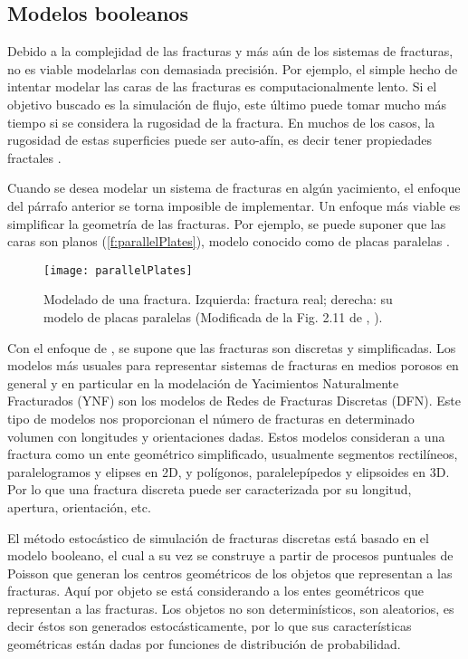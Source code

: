 \subsection{Modelos booleanos}

Debido a la complejidad de las fracturas y m\'as a\'un de los sistemas de fracturas, no es viable modelarlas con demasiada precisi\'on. Por ejemplo, el simple hecho de intentar modelar las caras de las fracturas es computacionalmente lento. Si el objetivo buscado es la simulaci\'on de flujo, este \'ultimo puede tomar mucho m\'as tiempo si se considera la rugosidad de la fractura. En muchos de los casos, la rugosidad de estas superficies puede ser auto-af\'in, es decir tener propiedades fractales \citep[ch. 4]{adler_fractures_1999}.

Cuando se desea modelar un sistema de fracturas en alg\'un yacimiento, el enfoque del p\'arrafo anterior se torna imposible de implementar. Un enfoque m\'as viable es simplificar la geometr\'ia de las fracturas. Por ejemplo, se puede suponer que las caras son planos (\autoref{f:parallelPlates}), modelo conocido como de placas paralelas \citep{dietrich_flow_2005}.

\begin{figure}[H]
	\centering
	\texttt{[image: parallelPlates]}
	\caption{Modelado de una fractura. Izquierda: fractura real; derecha: su modelo de placas paralelas (Modificada de la Fig. 2.11 de \citeauthor{dietrich_flow_2005}, \citeyear{dietrich_flow_2005}).}
	\label{f:parallelPlates}
\end{figure}

Con el enfoque de \cite{dietrich_flow_2005}, se supone que las fracturas son discretas y simplificadas. Los modelos m\'as usuales para representar sistemas de fracturas en medios porosos en general y en particular en la modelaci\'on de Yacimientos Naturalmente Fracturados (YNF) son los modelos de Redes de Fracturas Discretas (DFN). Este tipo de modelos nos proporcionan el n\'umero de fracturas en determinado volumen con longitudes y orientaciones dadas. Estos modelos consideran a una fractura como un ente geom\'etrico simplificado, usualmente segmentos rectil\'ineos, paralelogramos y elipses en 2D, y pol\'igonos, paralelep\'ipedos y elipsoides en 3D. Por lo que una fractura discreta puede ser caracterizada por su longitud, apertura, orientaci\'on, etc. 

El m\'etodo estoc\'astico de simulaci\'on de fracturas discretas est\'a basado en el modelo booleano, el cual a su vez se construye a partir de procesos puntuales de Poisson que generan los centros geom\'etricos de los objetos que representan a las fracturas. Aqu\'i por objeto se est\'a considerando a los entes geom\'etricos que representan a las fracturas. Los objetos no son determin\'isticos, son aleatorios, es decir \'estos son generados estoc\'asticamente, por lo que sus caracter\'isticas geom\'etricas est\'an dadas por funciones de distribuci\'on de probabilidad.

